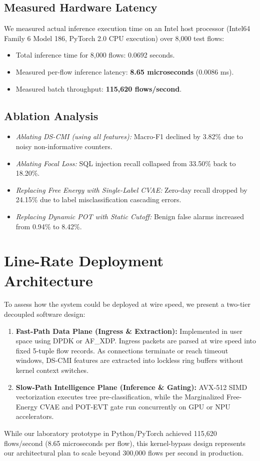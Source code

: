 \documentclass[10pt,journal,compsoc]{IEEEtran}
\begin{document}
\subsection{Measured Hardware Latency}
We measured actual inference execution time on an Intel host processor (Intel64 Family 6 Model 186, PyTorch 2.0 CPU execution) over 8,000 test flows:
\begin{itemize}
    \item Total inference time for 8,000 flows: 0.0692 seconds.
    \item Measured per-flow inference latency: \textbf{8.65 microseconds} (0.0086 ms).
    \item Measured batch throughput: \textbf{115,620 flows/second}.
\end{itemize}

\subsection{Ablation Analysis}
\begin{itemize}
    \item \textit{Ablating DS-CMI (using all features):} Macro-F1 declined by 3.82\% due to noisy non-informative counters.
    \item \textit{Ablating Focal Loss:} SQL injection recall collapsed from 33.50\% back to 18.20\%.
    \item \textit{Replacing Free Energy with Single-Label CVAE:} Zero-day recall dropped by 24.15\% due to label misclassification cascading errors.
    \item \textit{Replacing Dynamic POT with Static Cutoff:} Benign false alarms increased from 0.94\% to 8.42\%.
\end{itemize}

\section{Line-Rate Deployment Architecture}\label{sec:deployment}
To assess how the system could be deployed at wire speed, we present a two-tier decoupled software design:
\begin{enumerate}
    \item \textbf{Fast-Path Data Plane (Ingress & Extraction):} Implemented in user space using DPDK or AF\_XDP. Ingress packets are parsed at wire speed into fixed 5-tuple flow records. As connections terminate or reach timeout windows, DS-CMI features are extracted into lockless ring buffers without kernel context switches.
    \item \textbf{Slow-Path Intelligence Plane (Inference & Gating):} AVX-512 SIMD vectorization executes tree pre-classification, while the Marginalized Free-Energy CVAE and POT-EVT gate run concurrently on GPU or NPU accelerators.
\end{enumerate}
While our laboratory prototype in Python/PyTorch achieved 115,620 flows/second (8.65 microseconds per flow), this kernel-bypass design represents our architectural plan to scale beyond 300,000 flows per second in production.
\end{document}
